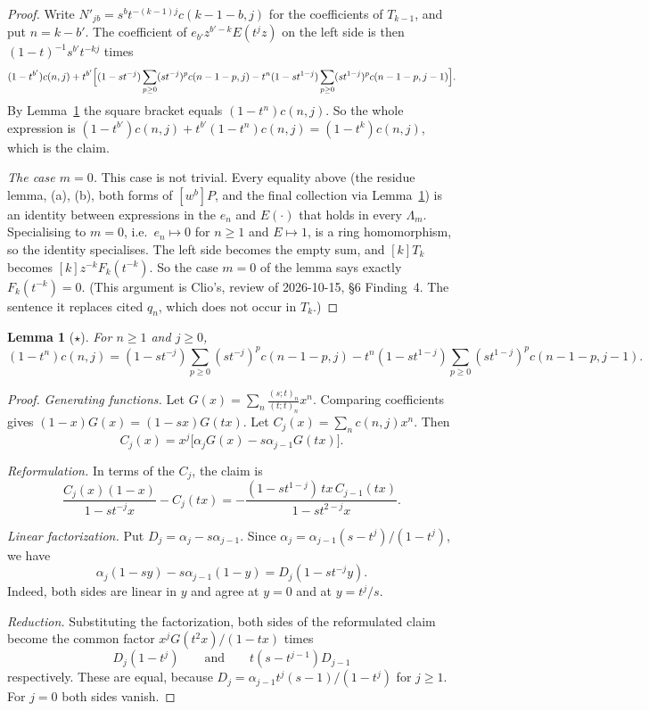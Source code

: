 \documentclass[11pt]{amsart}
\newtheorem{lemma}[theorem]{Lemma}
\theoremstyle{remark}
\newcommand{\poch}[2]{(#1;t)_{#2}}
\begin{document}
\begin{proof}
Write $N'_{jb}=s^bt^{-(k-1)j}c(k-1-b,j)$ for the coefficients of $T_{k-1}$, and put $n=k-b'$. The coefficient of $e_{b'}z^{b'-k}E(t^jz)$ on the left side is then $(1-t)^{-1}s^{b'}t^{-kj}$ times
\[
(1-t^{b'})c(n,j)+t^{b'}\Bigl[(1-st^{-j})\sum_{p\ge0}(st^{-j})^pc(n-1-p,j)-t^n(1-st^{1-j})\sum_{p\ge0}(st^{1-j})^pc(n-1-p,j-1)\Bigr].
\]
By Lemma~\ref{lem:star} the square bracket equals $(1-t^n)c(n,j)$. So the whole expression is $(1-t^{b'})c(n,j)+t^{b'}(1-t^n)c(n,j)=(1-t^k)c(n,j)$, which is the claim.

\emph{The case $m=0$.} This case is not trivial. Every equality above (the residue lemma, (a), (b), both forms of $[w^b]P$, and the final collection via Lemma~\ref{lem:star}) is an identity between expressions in the $e_n$ and $E(\cdot)$ that holds in every $\Lambda_m$. Specialising to $m=0$, i.e.\ $e_n\mapsto0$ for $n\ge1$ and $E\mapsto1$, is a ring homomorphism, so the identity specialises. The left side becomes the empty sum, and $[k]T_k$ becomes $[k]z^{-k}F_k(t^{-k})$. So the case $m=0$ of the lemma says exactly $F_k(t^{-k})=0$. (This argument is Clio's, review of 2026-10-15, \S6 Finding~4. The sentence it replaces cited $q_n$, which does not occur in $T_k$.)
\end{proof}

\begin{lemma}[$\star$]\label{lem:star}
For $n\ge1$ and $j\ge0$,
\[
(1-t^n)c(n,j)=(1-st^{-j})\sum_{p\ge0}(st^{-j})^pc(n-1-p,j)-t^n(1-st^{1-j})\sum_{p\ge0}(st^{1-j})^pc(n-1-p,j-1).
\]
\end{lemma}

\begin{proof}
\emph{Generating functions.} Let $G(x)=\sum_n\frac{\poch sn}{\poch tn}x^n$. Comparing coefficients gives $(1-x)G(x)=(1-sx)G(tx)$. Let $C_j(x)=\sum_nc(n,j)x^n$. Then
\[
C_j(x)=x^j\bigl[\alpha_jG(x)-s\alpha_{j-1}G(tx)\bigr].
\]

\emph{Reformulation.} In terms of the $C_j$, the claim is
\[
\frac{C_j(x)(1-x)}{1-st^{-j}x}-C_j(tx)=-\frac{(1-st^{1-j})\,tx\,C_{j-1}(tx)}{1-st^{2-j}x}.
\]

\emph{Linear factorization.} Put $D_j=\alpha_j-s\alpha_{j-1}$. Since $\alpha_j=\alpha_{j-1}(s-t^j)/(1-t^j)$, we have
\[
\alpha_j(1-sy)-s\alpha_{j-1}(1-y)=D_j(1-st^{-j}y).
\]
Indeed, both sides are linear in $y$ and agree at $y=0$ and at $y=t^j/s$.

\emph{Reduction.} Substituting the factorization, both sides of the reformulated claim become the common factor $x^jG(t^2x)/(1-tx)$ times
\[
D_j(1-t^j)\qquad\text{and}\qquad t(s-t^{j-1})D_{j-1}
\]
respectively. These are equal, because $D_j=\alpha_{j-1}t^j(s-1)/(1-t^j)$ for $j\ge1$. For $j=0$ both sides vanish.
\end{proof}
\end{document}
